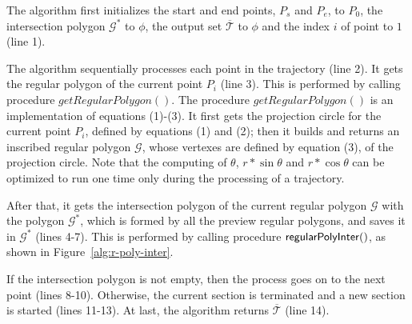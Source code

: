 The algorithm first initializes the start and end points, $P_s$ and $P_e$, to $P_0$, the intersection polygon $\mathcal{G}^*$ to $\phi$, the output set $\overline{\mathcal{T}}$ to $\phi$ and the index $i$ of point to $1$ (line 1).

The algorithm sequentially processes each point in the trajectory (line 2).
It gets the regular polygon of the current point $P_i$ (line 3).
This is performed by calling procedure $getRegularPolygon()$. The procedure $getRegularPolygon()$ is an implementation of equations (1)-(3). It first gets the projection circle for the current point $P_i$, defined by equations (1) and (2); then it builds and returns an inscribed regular polygon $\mathcal{G}$, whose vertexes are defined by equation (3), of the projection circle.
Note that the computing of $\theta$, $r*\sin\theta$ and $r*\cos\theta$ can be optimized to run one time only during the processing of a trajectory.

After that, it gets the intersection polygon of the current regular polygon $\mathcal{G}$ with the polygon $\mathcal{G}^*$, which is formed by all the preview regular polygons, and saves it in $\mathcal{G}^*$ (lines 4-7).
This is performed by calling procedure ${\mathsf{regularPolyInter}}()$, as shown in Figure~\ref{alg:r-poly-inter}.

If the intersection polygon is not empty, then the process goes on to the next point (lines 8-10).
Otherwise, the current section is terminated and a new section is started (lines 11-13).
%
At last, the algorithm returns $\overline{\mathcal{T}}$ (line 14).






